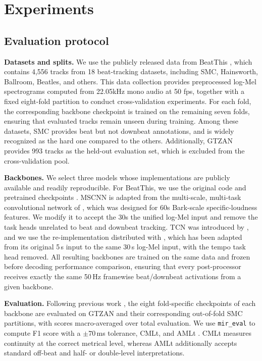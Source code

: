\documentclass{article}
\begin{document}
\section{Experiments}
\label{sec:exp}
\subsection{Evaluation protocol}
\textbf{Datasets and splits.} We use the publicly released data from BeatThis \cite{foscarin2024beat}, which contains 4,556 tracks from 18 beat-tracking datasets, including SMC, Hainsworth, Ballroom, Beatles, and others. This data collection provides preprocessed log-Mel spectrograms computed from 22.05kHz mono audio at 50 fps, together with a fixed eight-fold partition to conduct cross-validation experiments. For each fold, the corresponding backbone checkpoint is trained on the remaining seven folds, ensuring that evaluated tracks remain unseen during training. Among these datasets, SMC provides beat but not downbeat annotations, and is widely recognized as the hard one compared to the others. Additionally, GTZAN provides 993 tracks as the held-out evaluation set, which is excluded from the cross-validation pool.

\textbf{Backbones.} We select three models whose implementations are publicly available and readily reproducible. For BeatThis, we use the original code and pretrained checkpoints \cite{foscarin2024beat}. MSCNN is adapted from the multi-scale, multi-task convolutional network of \cite{he2026dynest}, which was designed for 60s Bark-scale specific-loudness features. We modify it to accept the 30s the unified log-Mel input and remove the task heads unrelated to beat and downbeat tracking. TCN was introduced by \cite{bock2020deconstruct}, and we use the re-implementation distributed with \cite{he2026dynest}, which has been adapted from its original 5\,s input to the same 30\,s log-Mel input, with the tempo task head removed. All resulting backbones are trained on the same data and frozen before decoding performance comparison, ensuring that every post-processor receives exactly the same 50\,Hz framewise beat/downbeat activations from a given backbone.

\textbf{Evaluation.} Following previous work \cite{foscarin2024beat}, the eight fold-specific checkpoints of each backbone are evaluated on GTZAN and their corresponding out-of-fold SMC partitions, with scores macro-averaged over total evaluation. We use \texttt{mir\_eval} to compute F1 score with a $\pm70$\,ms tolerance, CMLt, and AMLt \cite{raffel2014mireval}. CMLt measures continuity at the correct metrical level, whereas AMLt additionally accepts standard off-beat and half- or double-level interpretations.
\end{document}
